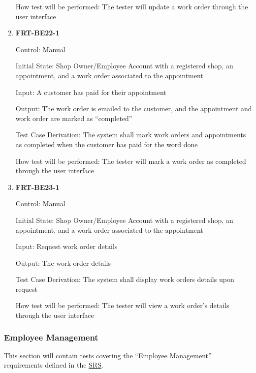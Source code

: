 \documentclass[12pt, titlepage]{article}
\begin{document}
\begin{enumerate}
	      How test will be performed: The tester will update a work order through the user interface

	\item \textbf{FRT-BE22-1}

	      Control: Manual

	      Initial State: Shop Owner/Employee Account with a registered shop, an appointment, and a work order
	      associated to the appointment

	      Input: A customer has paid for their appointment

	      Output: The work order is emailed to the customer, and the appointment and work order are marked as
	      ``completed''

	      Test Case Derivation: The system shall mark work orders and appointments as completed when the
	      customer has paid for the word done

	      How test will be performed: The tester will mark a work order as completed through the user
	      interface

	\item \textbf{FRT-BE23-1}

	      Control: Manual

	      Initial State: Shop Owner/Employee Account with a registered shop, an appointment, and a work order
	      associated to the appointment

	      Input: Request work order details

	      Output: The work order details

	      Test Case Derivation: The system shall display work orders details upon request

	      How test will be performed: The tester will view a work order's details through the user interface

\end{enumerate}

\subsubsection{Employee Management}

This section will contain tests covering the ``Employee Management'' requirements defined in the
\href{https://github.com/arkinmodi/project-sayyara/blob/main/docs/SRS/SRS.pdf}{SRS}.
\end{document}
